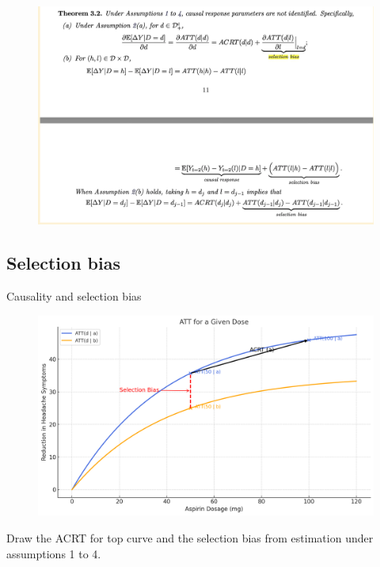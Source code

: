 \documentclass{beamer}
\begin{document}
\begin{frame}

\begin{figure}
\begin{center}
             \includegraphics[scale=0.45]{./lecture_includes/continuous6.png}
\end{center}
\end{figure}

\end{frame}

\subsection{Selection bias}



\begin{frame}{Causality and selection bias}

\begin{figure}
\begin{center}
             \includegraphics[scale=0.3]{./lecture_includes/acrt_fig2d.png}
\end{center}
\end{figure}

Draw the ACRT for top curve and the selection bias from estimation under assumptions 1 to 4.

\end{frame}
\end{document}
